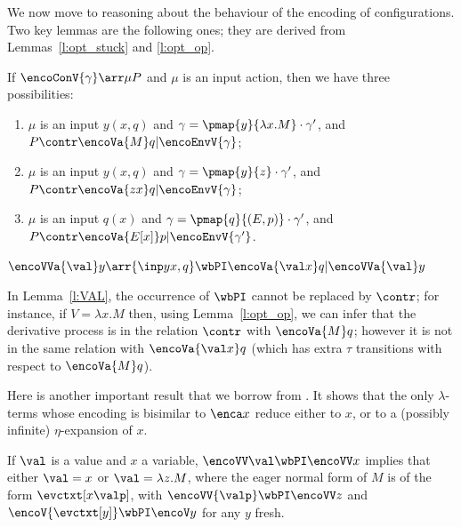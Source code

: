 \noindent
We now move to reasoning about the behaviour of the encoding of configurations. 
Two key lemmas are the following ones; they are derived from Lemmas~\ref{l:opt_stuck} and
\ref{l:opt_op}.

\begin{lemma} %
\label{l:opt_con}
If  $\encoConV{\gamma } \arr \mu P$ and $\mu$ is an input action, then we have three possibilities:
\begin{enumerate}

\item $\mu $ is an input $y(x,q)$ and $\gamma 
= \pmap{y}{\lambda x . M}\cdot\gamma' $, and $P \contr 
\encoVa {M} q  | \encoEnvV{\gamma  } $; 

\item $\mu $ is an input $y(x,q)$ and $\gamma 
= \pmap{y}{z}\cdot\gamma' $, and $P \contr 
\encoVa {zx} q  | \encoEnvV{\gamma  } $; 


\item $\mu $ is an input $q(x)$ and $\gamma 
= \pmap{q}{(E,p)}\cdot\gamma' $, and $P\contr 
\encoVa {E[x]} p  | \encoEnvV{\gamma'  } $. 
\end{enumerate} 
\end{lemma}
 

\begin{lemma}
\label{l:VAL}
  $\encoVVa {\val} y  \arr {\inp y {x,q}} \wbPI 
\encoVa {\val x } q | \encoVVa {\val} y$
\end{lemma}              
\noindent
In Lemma~\ref{l:VAL}, the occurrence of $ \wbPI$ cannot be replaced by $\contr$; 
for instance, if $V = \lambda x. M$ then, using Lemma~\ref{l:opt_op}, we can infer that 
the derivative process is in the relation $\contr$ with 
$\encoVa {M } q$; however it is not in the same relation with 
$\encoVa {\val x } q$ (which has extra $\tau$ transitions with respect to $\encoVa {M } q$).

 
\iflong
{} 
Here is another important result that we borrow from \cite{DurierHS18}.
It shows  that the only $\lambda$-terms
 whose encoding is bisimilar to 
$\enca x$ reduce either to $x$, or to a (possibly infinite) 
$\eta$-expansion of $x$.

\begin{lemma}\label{l:opt_eta}
  If $\val$ is a value and $x$ a variable,
  $\encoVV \val\wbPI \encoVV x$ %
  implies that either $\val=x$ or $\val = \lambda   z. {M}$, where the eager
  normal form of $M$ is of the form $\evctxt[x\valp]$, with
  $\encoVV {\valp}\wbPI \encoVV z$ and $\encoV {\evctxt[y]}\wbPI\encoV y$
  for any $y$ fresh.
\end{lemma}

